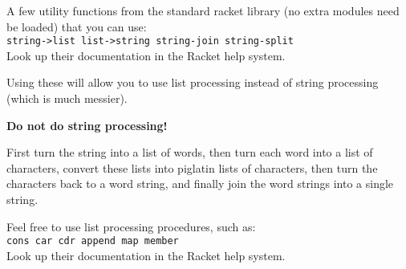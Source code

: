 \documentclass{article}
\begin{document}
\begin{description}
  A few utility functions from the standard racket library (no extra
  modules need be loaded) that you can use:\\
{  \tt string->list \hfill list->string \hfill string-join \hfill
  string-split }\\
Look up their documentation in the Racket help system.

Using these will allow you to use list processing instead of string
processing (which is much messier).

{\bf Do not do string
  processing!}

First turn the string into a list of words, then turn each word into a
list of characters, convert these lists into piglatin lists of
characters, then turn the characters back to a word string, and
finally join the word strings into a single string.

Feel free to use list processing procedures, such as:\\
{\tt cons \hfill car \hfill cdr \hfill append \hfill map \hfill member }\\
Look up their documentation in the Racket help system.


\end{description}
\end{document}
